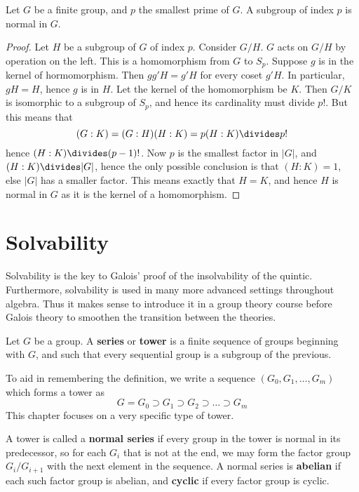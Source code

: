 \begin{theorem}
    Let $G$ be a finite group, and $p$ the smallest prime of $G$. A subgroup of index $p$ is normal in $G$.
\end{theorem}
\begin{proof}
    Let $H$ be a subgroup of $G$ of index $p$. Consider $G/H$. $G$ acts on $G/H$ by operation on the left. This is a homomorphism from $G$ to $S_p$. Suppose $g$ is in the kernel of hormomorphism. Then $gg'H = g'H$ for every coset $g'H$. In particular, $gH = H$, hence $g$ is in $H$. Let the kernel of the homomorphism be $K$. Then $G/K$ is isomorphic to a subgroup of $S_p$, and hence its cardinality must divide $p!$. But this means that
    \[ (G:K) = (G:H)(H:K) = p(H:K) \divides p! \]
    hence $(H:K) \divides (p-1)!$. Now $p$ is the smallest factor in $|G|$, and $(H:K) \divides |G|$, hence the only possible conclusion is that $(H:K) = 1$, else $|G|$ has a smaller factor. This means exactly that $H = K$, and hence $H$ is normal in $G$ as it is the kernel of a homomorphism.
\end{proof}









\chapter{Solvability}

Solvability is the key to Galois' proof of the insolvability of the quintic. Furthermore, solvability is used in many more advanced settings throughout algebra. Thus it makes sense to introduce it in a group theory course before Galois theory to smoothen the transition between the theories.

Let $G$ be a group. A {\bf series}  or {\bf tower}  is a finite sequence of groups beginning with $G$, and such that every sequential group is a subgroup of the previous.

To aid in remembering the definition, we write a sequence $(G_0, G_1, \dots, G_m)$ which forms a tower as
%
\[ G = G_0 \supset G_1 \supset G_2 \supset \dots \supset G_m \]
%
This chapter focuses on a very specific type of tower.

A tower is called a {\bf normal series} if every group in the tower is normal in its predecessor, so for each $G_i$ that is not at the end, we may form the factor group $G_i/G_{i+1}$ with the next element in the sequence. A normal series is {\bf abelian} if each such factor group is abelian, and {\bf cyclic}  if every factor group is cyclic.

